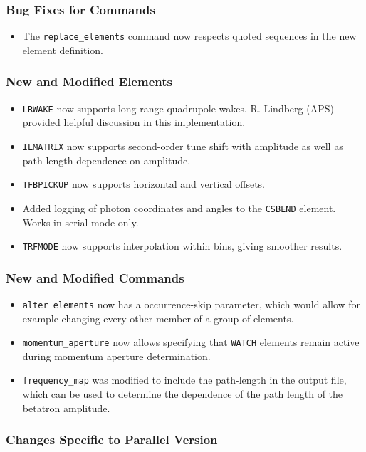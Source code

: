 \documentclass[11pt]{article}
\begin{document}
\subsubsection{Bug Fixes for Commands}
\begin{itemize}
\item The \verb|replace_elements| command now respects quoted sequences in the new element definition.
\end{itemize}

\subsubsection{New and Modified Elements}
\begin{itemize}
\item \verb|LRWAKE| now supports long-range quadrupole wakes. R. Lindberg (APS) provided helpful
  discussion in this implementation.
\item \verb|ILMATRIX| now supports second-order tune shift with amplitude as well as path-length dependence
  on amplitude.
\item \verb|TFBPICKUP| now supports horizontal and vertical offsets.
\item Added logging of photon coordinates and angles to the \verb|CSBEND| element. Works in serial mode only.
\item \verb|TRFMODE| now supports interpolation within bins, giving smoother results.
\end{itemize}

\subsubsection{New and Modified Commands}
\begin{itemize}
\item \verb|alter_elements| now has a occurrence-skip parameter, which would allow for example changing every other
  member of a group of elements.
\item \verb|momentum_aperture| now allows specifying that \verb|WATCH| elements remain active during momentum aperture
  determination.
\item \verb|frequency_map| was modified to include the path-length in the output file, which can be used to determine
  the dependence of the path length of the betatron amplitude.
\end{itemize}

\subsubsection{Changes Specific to Parallel Version}
\end{document}
